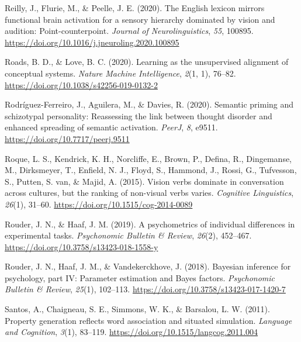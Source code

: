 \documentclass[
  12pt,
  man,floatsintext]{apa7}
\newlength{\cslhangindent}
\newlength{\cslentryspacingunit} %
\newenvironment{CSLReferences}[2] %
 {%
  \setlength{\parindent}{0pt}
  \ifodd #1
  \let\oldpar\par
  \def\par{\hangindent=\cslhangindent\oldpar}
  \fi
  \setlength{\parskip}{#2\cslentryspacingunit}
 }%
 {}
\begin{document}
\begin{CSLReferences}{1}{0}
\leavevmode{}%
Reilly, J., Flurie, M., \& Peelle, J. E. (2020). The {English} lexicon mirrors functional brain activation for a sensory hierarchy dominated by vision and audition: {Point-counterpoint}. \emph{Journal of Neurolinguistics}, \emph{55}, 100895. \url{https://doi.org/10.1016/j.jneuroling.2020.100895}

\leavevmode{}%
Roads, B. D., \& Love, B. C. (2020). Learning as the unsupervised alignment of conceptual systems. \emph{Nature Machine Intelligence}, \emph{2}(1, 1), 76--82. \url{https://doi.org/10.1038/s42256-019-0132-2}

\leavevmode{}%
Rodríguez-Ferreiro, J., Aguilera, M., \& Davies, R. (2020). Semantic priming and schizotypal personality: Reassessing the link between thought disorder and enhanced spreading of semantic activation. \emph{PeerJ}, \emph{8}, e9511. \url{https://doi.org/10.7717/peerj.9511}

\leavevmode{}%
Roque, L. S., Kendrick, K. H., Norcliffe, E., Brown, P., Defina, R., Dingemanse, M., Dirksmeyer, T., Enfield, N. J., Floyd, S., Hammond, J., Rossi, G., Tufvesson, S., Putten, S. van, \& Majid, A. (2015). Vision verbs dominate in conversation across cultures, but the ranking of non-visual verbs varies. \emph{Cognitive Linguistics}, \emph{26}(1), 31--60. \url{https://doi.org/10.1515/cog-2014-0089}

\leavevmode{}%
Rouder, J. N., \& Haaf, J. M. (2019). A psychometrics of individual differences in experimental tasks. \emph{Psychonomic Bulletin \& Review}, \emph{26}(2), 452--467. \url{https://doi.org/10.3758/s13423-018-1558-y}

\leavevmode{}%
Rouder, J. N., Haaf, J. M., \& Vandekerckhove, J. (2018). Bayesian inference for psychology, part {IV}: {Parameter} estimation and {Bayes} factors. \emph{Psychonomic Bulletin \& Review}, \emph{25}(1), 102--113. \url{https://doi.org/10.3758/s13423-017-1420-7}

\leavevmode{}%
Santos, A., Chaigneau, S. E., Simmons, W. K., \& Barsalou, L. W. (2011). Property generation reflects word association and situated simulation. \emph{Language and Cognition}, \emph{3}(1), 83--119. \url{https://doi.org/10.1515/langcog.2011.004}


\end{CSLReferences}
\end{document}
